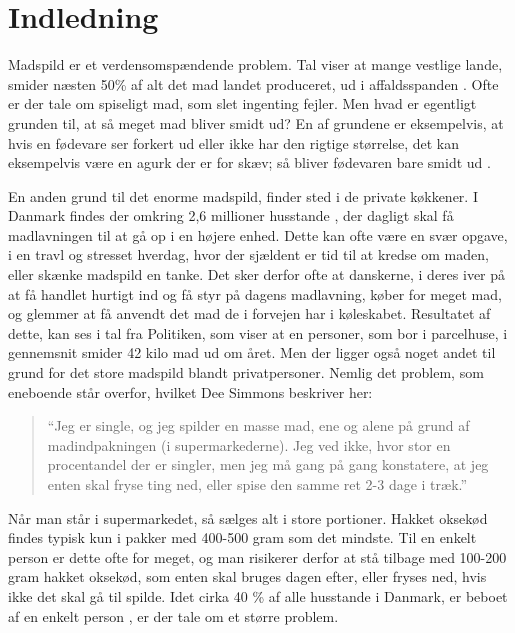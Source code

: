 \section{Indledning}
\label{sec:indledning}

Madspild er et verdensomspændende problem. Tal viser at mange vestlige lande, smider næsten 50\% af alt det mad landet produceret, ud i affaldsspanden . Ofte er der tale om spiseligt mad, som slet ingenting fejler. Men hvad er egentligt grunden til, at så meget mad bliver smidt ud? En af grundene er eksempelvis, at hvis en fødevare ser forkert ud eller ikke har den rigtige størrelse, det kan eksempelvis være en agurk der er for skæv; så bliver fødevaren bare smidt ud \cite{tedmadspild}. 

En anden grund til det enorme madspild, finder sted i de private køkkener. I Danmark findes der omkring 2,6 millioner husstande \cite{husstande}, der dagligt skal få madlavningen til at gå op i en højere enhed. Dette kan ofte være en svær opgave, i en travl og stresset hverdag, hvor der sjældent er tid til at kredse om maden, eller skænke madspild en tanke. Det sker derfor ofte at danskerne, i deres iver på at få handlet hurtigt ind og få styr på dagens madlavning, køber for meget mad, og glemmer at få anvendt det mad de i forvejen har i køleskabet. Resultatet af dette, kan ses i tal fra Politiken, som viser at en personer, som bor i parcelhuse, i gennemsnit smider 42 kilo mad ud om året. \cite{madspildpol} Men der ligger også noget andet til grund for det store madspild blandt privatpersoner. Nemlig det problem, som eneboende står overfor, hvilket Dee Simmons beskriver her: 

\begin{quote}
``Jeg er single, og jeg spilder en masse mad, ene og alene på grund af madindpakningen (i supermarkederne). Jeg ved ikke, hvor stor en procentandel der er singler, men jeg må gang på gang konstatere, at jeg enten skal fryse ting ned, eller spise den samme ret 2-3 dage i træk.'' \cite{tedcomment}
\end{quote}
 
Når man står i supermarkedet, så sælges alt i store portioner. Hakket oksekød findes typisk kun i pakker med 400-500 gram som det mindste. Til en enkelt person er dette ofte for meget, og man risikerer derfor at stå tilbage med 100-200 gram hakket oksekød, som enten skal bruges dagen efter, eller fryses ned, hvis ikke det skal gå til spilde. Idet cirka 40 \% af alle husstande i Danmark, er beboet af en enkelt person \cite{madspild16}, er der tale om et større problem. 

